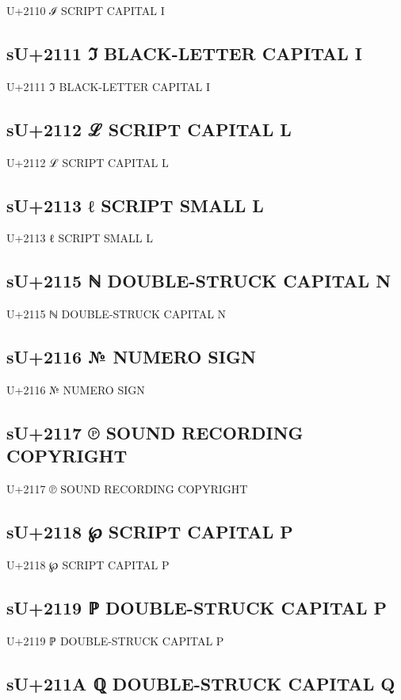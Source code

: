U+2110 ℐ SCRIPT CAPITAL I

\subsection{sU+2111 ℑ BLACK-LETTER CAPITAL I}

U+2111 ℑ BLACK-LETTER CAPITAL I

\subsection{sU+2112 ℒ SCRIPT CAPITAL L}

U+2112 ℒ SCRIPT CAPITAL L

\subsection{sU+2113 ℓ SCRIPT SMALL L}

U+2113 ℓ SCRIPT SMALL L

\subsection{sU+2115 ℕ DOUBLE-STRUCK CAPITAL N}

U+2115 ℕ DOUBLE-STRUCK CAPITAL N

\subsection{sU+2116 №  NUMERO SIGN}

U+2116 №  NUMERO SIGN

\subsection{sU+2117 ℗  SOUND RECORDING COPYRIGHT}

U+2117 ℗  SOUND RECORDING COPYRIGHT

\subsection{sU+2118 ℘ SCRIPT CAPITAL P}

U+2118 ℘ SCRIPT CAPITAL P

\subsection{sU+2119 ℙ DOUBLE-STRUCK CAPITAL P}

U+2119 ℙ DOUBLE-STRUCK CAPITAL P

\subsection{sU+211A ℚ DOUBLE-STRUCK CAPITAL Q}

